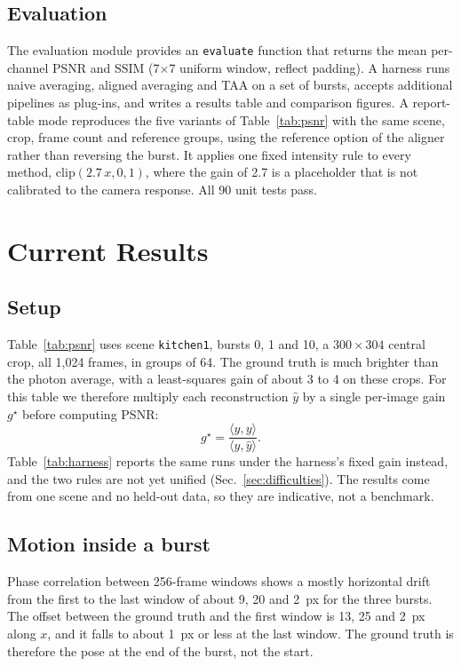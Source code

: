 \documentclass[10pt,twocolumn]{article}
\newcommand{\sref}[1]{Sec.~\ref{#1}}
\begin{document}
\subsection{Evaluation}

The evaluation module provides an \texttt{evaluate} function that returns the mean per-channel PSNR and SSIM (7$\times$7 uniform window, reflect padding). A harness runs naive averaging, aligned averaging and TAA on a set of bursts, accepts additional pipelines as plug-ins, and writes a results table and comparison figures. A report-table mode reproduces the five variants of Table~\ref{tab:psnr} with the same scene, crop, frame count and reference groups, using the reference option of the aligner rather than reversing the burst. It applies one fixed intensity rule to every method, $\mathrm{clip}(2.7\,x,0,1)$, where the gain of 2.7 is a placeholder that is not calibrated to the camera response. All 90 unit tests pass.

\section{Current Results}
\label{sec:results}

\subsection{Setup}

Table~\ref{tab:psnr} uses scene \texttt{kitchen1}, bursts 0, 1 and 10, a $300\times304$ central crop, all 1{,}024 frames, in groups of 64. The ground truth is much brighter than the photon average, with a least-squares gain of about 3 to 4 on these crops. For this table we therefore multiply each reconstruction $\hat{y}$ by a single per-image gain $g^\star$ before computing PSNR:
\begin{equation}
  g^\star = \frac{\langle \hat{y}, y\rangle}{\langle \hat{y}, \hat{y}\rangle}.
\end{equation}
Table~\ref{tab:harness} reports the same runs under the harness's fixed gain instead, and the two rules are not yet unified (\sref{sec:difficulties}). The results come from one scene and no held-out data, so they are indicative, not a benchmark.

\subsection{Motion inside a burst}

Phase correlation between 256-frame windows shows a mostly horizontal drift from the first to the last window of about 9, 20 and 2~px for the three bursts. The offset between the ground truth and the first window is 13, 25 and 2~px along $x$, and it falls to about 1~px or less at the last window. The ground truth is therefore the pose at the end of the burst, not the start.
\end{document}
